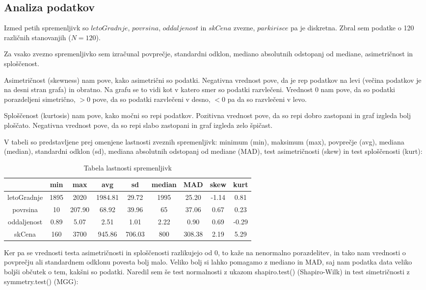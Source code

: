 \documentclass[a4paper, 12pt]{article}
\begin{document}
\subsection{Analiza podatkov}

Izmed petih spremenljivk so $ letoGradnje $, $ povrsina $,
$ oddaljenost $ in $ skCena $ zvezne, $ parkirisce $ pa je
diskretna. Zbral sem podatke o 120 različnih stanovanjih ($ N = 120 $).

Za vsako zvezno spremenljivko sem izračunal povprečje, standardni odklon,
mediano absolutnih odstopanj od mediane, asimetričnost in sploščenost.

Asimetričnost (skewness) nam pove, kako asimetrični so podatki. Negativna
vrednost pove, da je rep podatkov na levi (večina podatkov je na desni stran
grafa) in obratno. Na grafu se to vidi kot v katero smer so podatki razvlečeni.
Vrednost $ 0 $ nam pove, da so podatki porazdeljeni simetrično, $ >0 $ pove, da
so podatki razvlečeni v desno, $ <0 $ pa da so razvlečeni v levo.

Sploščenost (kurtosis) nam pove, kako močni so repi podatkov. Pozitivna
vrednost pove, da so repi dobro zastopani in graf izgleda bolj ploščato.
Negativna vrednost pove, da so repi slabo zastopani in graf izgleda zelo
špičast.

V tabeli so predstavljene prej omenjene lastnosti zveznih spremenljivk:
minimum (min), maksimum (max), povprečje (avg), mediana (median),
standardni odklon (sd), mediana absolutnih odstopanj od mediane (MAD), test
asimetričnosti (skew) in test sploščenosti (kurt):
\begin{table}[H]
\begin{center}
\caption{Tabela lastnosti spremenljivk}
\label{table:2}
\begin{tabular}{ c|cccccccc }
	& min & max & avg & sd & median & MAD & skew & kurt \\
	\hline
	letoGradnje & 1895 & 2020 & 1984.81 & 29.72 & 1995 & 25.20 & -1.14 & 0.81 \\
	povrsina & 10 & 207.90 & 68.92 & 39.96 & 65 & 37.06 & 0.67 & 0.23 \\
	oddaljenost & 0.89 & 5.07 & 2.51 & 1.01 & 2.22 & 0.90 & 0.69 & -0.29 \\
	skCena & 160 & 3700 & 945.86 & 706.03 & 800 & 308.38 & 2.19 & 5.29 \\
\end{tabular}
\end{center}
\end{table}

Ker pa se vrednosti testa asimetričnosti in sploščenosti razlikujejo od $ 0 $,
to kaže na nenormalno porazdelitev, in tako nam vrednosti o povprečju ali
standardnem odklonu povesta bolj malo. Veliko bolj si lahko pomagamo z mediano
in MAD, saj nam podatka data veliko boljši občutek o tem, kakšni so podatki.
Naredil sem še test normalnosti z ukazom {\sf shapiro.test()} (Shapiro-Wilk)
in test simetričnosti z {\sf symmetry.test()} (MGG):
\end{document}
